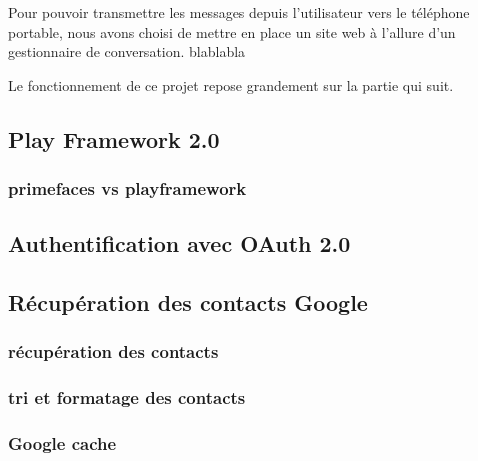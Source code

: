 Pour pouvoir transmettre les messages depuis l'utilisateur vers le téléphone portable, nous avons
choisi de mettre en place un site web à l'allure d'un gestionnaire de conversation. 
blablabla

Le fonctionnement de ce projet repose grandement sur la partie qui suit.
\\


\subsection{Play Framework 2.0}

\subsubsection{primefaces vs playframework}



\subsection{Authentification avec OAuth 2.0}



\subsection{Récupération des contacts Google}



\subsubsection{récupération des contacts}

\subsubsection{tri et formatage des contacts}

\subsubsection{Google cache}



